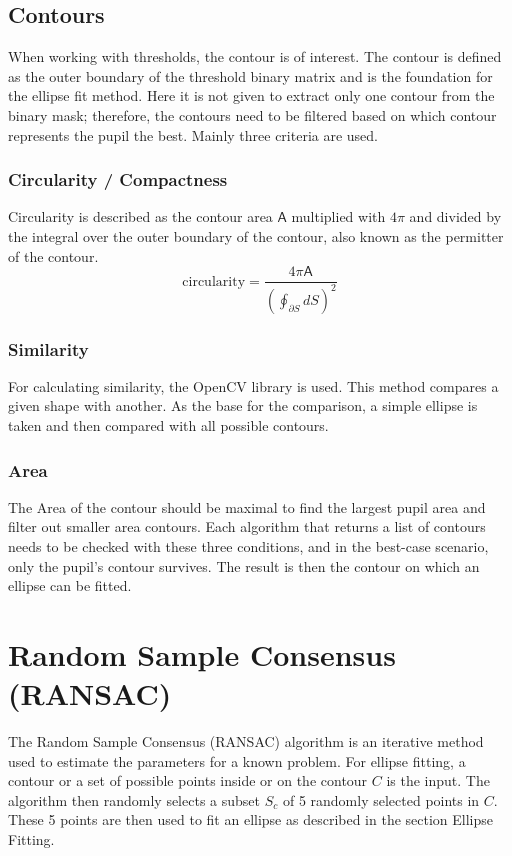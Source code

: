 \subsection{Contours}
When working with thresholds, the contour is of interest. The contour is defined as the outer boundary of the threshold binary matrix and is the foundation for the ellipse fit method. 
Here it is not given to extract only one contour from the binary mask; therefore, the contours need to be filtered based on which contour represents the pupil the best. 
Mainly three criteria are used. 

\subsubsection{Circularity / Compactness}
Circularity is described  as the contour area $\mathsf{A} $ multiplied with $4\pi$ and divided by the integral over the outer boundary of the contour, also known as the permitter of the contour.
\begin{equation}
    \text{circularity} = \frac{4\pi\mathsf{A} }{(\oint_{\partial S} dS)^2}
\end{equation}

\subsubsection{Similarity }
For calculating similarity, the OpenCV library is used. This method compares a given shape with another. As the base for the comparison, a simple ellipse is taken and then compared with all possible contours.

\subsubsection{Area}
The Area of the contour should be maximal to find the largest pupil area and filter out smaller area contours. 
Each algorithm that returns a list of contours needs to be checked with these three conditions, and in the best-case scenario, only the pupil's contour survives. The result is then the contour on which an ellipse can be fitted. 
\newpage
\section{Random Sample Consensus (RANSAC) }
\label{sus:ransac}
The Random Sample Consensus (RANSAC) \cite{derpanis_overview_2010} algorithm is an iterative method used to estimate the parameters for a known problem. For ellipse fitting, a contour or a set of possible points inside or on the contour $C$ is the input. The algorithm then randomly selects a subset $S_c$ of 5 randomly selected points in $C$. 
These 5 points are then used to fit an ellipse as described in the section Ellipse Fitting.

